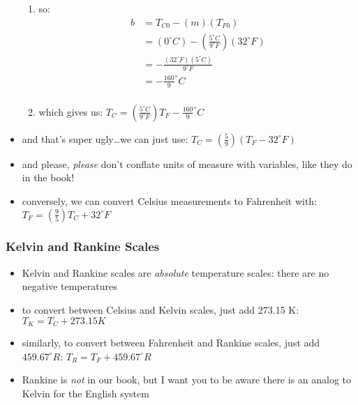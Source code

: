 \documentclass[11pt, oneside]{article}   	%
\begin{document}
\begin{itemize}
\begin{enumerate}
\item so:
\begin{equation} 
\boxed{
\begin{split}
   b &= T_{C0} - ( m ) ( T_{F0}) \\
      &= ( 0^{\circ}C ) - (\frac{5^{\circ}C}{9^{\circ} F} ) ( 32^{\circ} F ) \\
      &= - \frac{(32^{\circ} F)(5^{\circ}C)}{9^{\circ} F} \\
      &= - \frac{160}{9} ^{\circ} C  \\
 \end{split}
 }
\end{equation}
\item which gives us: $T_C = (\frac{5^{\circ}C}{9^{\circ} F}) T_F -  \frac{160}{9} ^{\circ} C $
\end{enumerate}
\item and that's super ugly\ldots we can just use: $T_C = (\frac{5}{9})(T_F - 32^{\circ} F)$ \cite[p. 45]{wile-chem-2}
\item and please, \emph{please} don't conflate units of measure with variables, like they do in the book!
\item conversely, we can convert Celsius measurements to Fahrenheit with: $T_F = (\frac{9}{5}) T_C + 32^{\circ} F$  \cite[p. 46]{wile-chem-2}
\end{itemize}

\subsubsection{Kelvin and Rankine Scales}
\begin{itemize}
\item Kelvin and Rankine scales are \emph{absolute} temperature scales: there are no negative temperatures
\item to convert between Celsius and Kelvin scales, just add 273.15 K: $T_K = T_C + 273.15 K $ \cite[p. 46]{wile-chem-2}
\item similarly, to convert between Fahrenheit and Rankine scales, just add $459.67 ^{\circ} R$: $T_R = T_F + 459.67 ^{\circ} R$
\item Rankine is \emph{not} in our book, but I want you to be aware there is an analog to Kelvin for the English system
\end{itemize}
\end{document}
